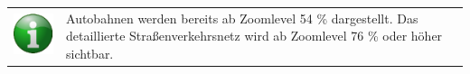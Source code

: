 \documentclass[10pt]{scrreprt}
\begin{document}
\vspace{3mm}
\begin{figure}[!htb]
	\centering
    \hspace{5mm}    
\end{figure} 

\vspace{3mm}
\begin{tabular}{>{\centering \arraybackslash}m{1cm} m{14cm}}
\includegraphics[scale=0.5]{images/info.eps} & Autobahnen werden bereits ab Zoomlevel 54 \% dargestellt. Das detaillierte Straßenverkehrsnetz wird ab Zoomlevel 76 \% oder höher sichtbar.
\end{tabular}
\end{document}
